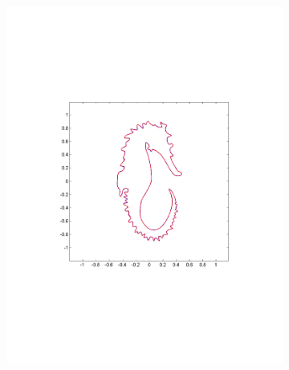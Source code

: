 \documentclass[annual]{acmsiggraph}
\begin{document}
\begin{figure}
        \centering
		\begin{subfigure}[b]{0.34\linewidth}
                \centering
                \includegraphics[width=\textwidth]{images/seahorse/1.pdf}
       \end{subfigure}
		~
		\begin{subfigure}[b]{0.34\linewidth}
                \centering

\end{subfigure}
\end{figure}
\end{document}
